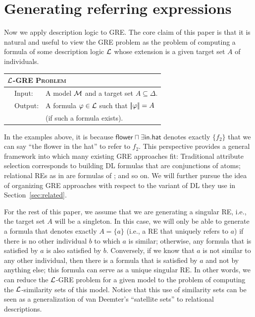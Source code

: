 \section{Generating referring expressions} \label{sec:gre}

Now we apply description logic to GRE.  The core claim of this paper
is that it is natural and useful to view the GRE problem as the
problem of computing a formula of some description logic $\mathcal{L}$ whose
extension is a given target set $A$ of individuals.

\medskip
\noindent
{\small
\begin{center}
\begin{tabular}{ll} \hline
\multicolumn{2}{l}{
\textsc{$\mathcal{L}$-GRE Problem}}\\ \hline
\ \ Input: & A model $\mathcal{M}$ and a target set $A \subseteq \Delta$.\\
\ \ Output: & A formula $\varphi \in \mathcal{L}$ such that
$|\!|\varphi|\!| = A$\\ 
& \hspace*{0.5cm} (if such a formula exists).\\ \hline
\end{tabular}
\end{center}}
\medskip

In the examples above, it is because $\mathsf{flower} \sqcap \exists
\mathsf{in}. \mathsf{hat}$ denotes exactly $\{f_2\}$ that we can say
``the flower in the hat'' to refer to $f_2$.  This perspective
provides a general framework into which many existing GRE approaches
fit: Traditional attribute selection \cite{Dale1995} corresponds to
building DL formulas that are conjunctions of atoms; relational REs as
in  are formulas of
\el; and so on.  We will further pursue the idea of organizing GRE
approaches with respect to the variant of DL they use in
Section~\ref{sec:related}.

For the rest of this paper, we assume that we are generating a
singular RE, i.e., the target set $A$ will be a singleton.  In this
case, we will only be able to generate a formula that denotes exactly
$A = \{a\}$ (i.e., a RE that uniquely refers to $a$) if there is no
other individual $b$ to which $a$ is similar; otherwise, any formula
that is satisfied by $a$ is also satisfied by $b$.  Conversely, if we
know that $a$ is not similar to any other individual, then there is a
formula that is satisfied by $a$ and not by anything else; this
formula can serve as a unique singular RE.  In other words, we can
reduce the $\mathcal{L}$-GRE problem for a given model to the problem of
computing the $\mathcal{L}$-similarity sets of this model.  Notice that this
use of similarity sets can be seen as a generalization of van
Deemter's  ``satellite sets''
to relational descriptions.

